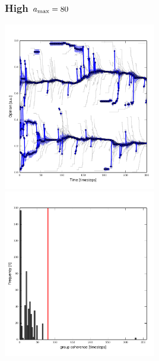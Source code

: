 \documentclass[10pt]{beamer}
\begin{document}
\begin{frame}\frametitle{High $a_{\rm max}=80$}
    \begin{center}
        \includegraphics[width=0.5\textwidth]{fig/evol_80.pdf}
        \includegraphics[width=0.5\textwidth]{fig/var_80.pdf}
    \end{center}


\end{frame}
\end{document}
